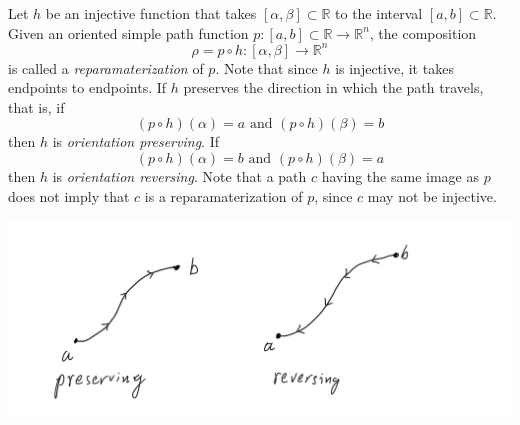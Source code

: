   \begin{definition}
  Let $h$ be an injective function that takes $[\alpha,\beta] \subset \mathbb{R}$ to the interval $[a, b] \subset \mathbb{R}$. Given an oriented simple path function $p: [a,b]\subset \mathbb{R} \longrightarrow \mathbb{R}^n$, the composition
  \[\rho = p \circ h: [\alpha, \beta] \longrightarrow \mathbb{R}^n\]
  is called a \textit{reparamaterization} of $p$. Note that since $h$ is injective, it takes endpoints to endpoints. If $h$ preserves the direction in which the path travels, that is, if 
  \[(p \circ h)(\alpha) = a \text{ and } (p \circ h)(\beta) = b\]
  then $h$ is \textit{orientation preserving}. If
  \[(p \circ h)(\alpha) = b \text{ and } (p \circ h)(\beta) = a\]
  then $h$ is \textit{orientation reversing}. Note that a path $c$ having the same image as $p$ does not imply that $c$ is a reparamaterization of $p$, since $c$ may not be injective. 
  \begin{center}
      \includegraphics[scale=0.25]{img/Orientation_Preserving_Reversing.PNG}
  \end{center}
  \end{definition}

